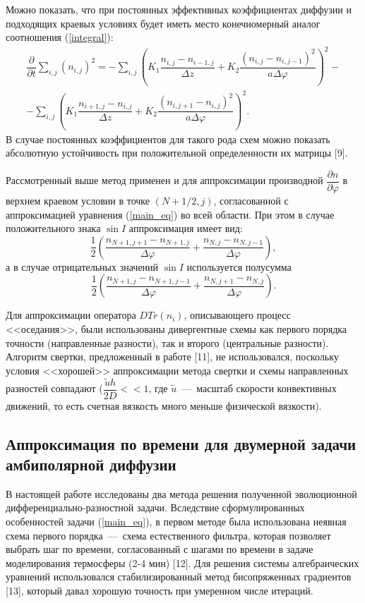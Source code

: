 \documentclass[14pt, a4paper]{extarticle}
\begin{document}
Можно показать, что при постоянных эффективных коэффициентах диффузии и подходящих краевых условиях будет иметь место конечномерный аналог соотношения (\ref{integral}):
\begin{gather}
\dfrac{\partial}{\partial t} \sum_{i, j} (n_{i, j})^2 = - \sum_{i, j}\left(K_1 \dfrac{n_{i, j} - n_{i-1, j}}{\Delta z} + K_2\dfrac{(n_{i, j} - n_{i, j-1})^2}{a \Delta \varphi}\right)^2 -\nonumber \\  - \sum_{i, j}\left(K_1 \dfrac{n_{i+1, j} - n_{i, j}}{\Delta z} + K_2\dfrac{(n_{i, j+1} - n_{i, j})^2}{a \Delta \varphi}\right)^2.
\label{integral_discrete}
\end{gather}
В случае постоянных коэффициентов для такого рода схем можно показать абсолютную устойчивость при положительной определенности их матрицы [9]. 

Рассмотренный выше метод применен и для аппроксимации производной $\dfrac{\partial n}{\partial\varphi}$ в верхнем краевом условии в точке $(N+1/2, j)$, согласованной с аппроксимацией уравнения (\ref{main_eq}) во всей области. При этом в случае положительного знака $\sin I$ аппроксимация имеет вид: \begin{equation}\dfrac{1}{2}\left(\dfrac{n_{N+1, j+1}-n_{N+1, j}}{\Delta\varphi} + \dfrac{n_{N, j} - n_{N, j-1}}{\Delta\varphi}\right),\end{equation} а в случае отрицательных значений $\sin I$ используется полусумма \begin{equation}\dfrac{1}{2}\left(\dfrac{n_{N+1, j}-n_{N+1, j-1}}{\Delta\varphi} + \dfrac{n_{N, j+1} - n_{N, j}}{\Delta\varphi}\right).\end{equation}

Для аппроксимации оператора $DTr(n_i)$, описывающего процесс <<оседания>>, были использованы дивергентные схемы как первого порядка точности (направленные разности), так и второго (центральные разности). Алгоритм свертки, предложенный в работе [11], не использовался, поскольку условия <<хорошей>> аппроксимации метода свертки и схемы направленных разностей совпадают ($\dfrac{\tilde{u}h}{2D}<<1$, где $\tilde{u}$~---~масштаб скорости конвективных движений, то есть счетная вязкость много меньше физической вязкости).


\subsection{Аппроксимация по времени для двумерной задачи амбиполярной диффузии}

В настоящей работе исследованы два метода решения полученной эволюционной дифференциально-разностной задачи. Вследствие сформулированных особенностей задачи (\ref{main_eq}), в первом методе была использована неявная схема первого порядка~---~схема естественного фильтра, которая позволяет выбрать шаг по времени, согласованный с шагами по времени в задаче моделирования термосферы (2-4 мин) [12]. Для решения системы алгебраических уравнений использовался стабилизированный метод бисопряженных градиентов [13], который давал хорошую точность при умеренном числе итераций.
\end{document}
